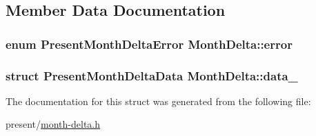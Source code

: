 \subsection{\-Member \-Data \-Documentation}
\hypertarget{structMonthDelta_a437eb7cd23ab33a773a8fb97b5923454}{
\subsubsection[{error}]{\setlength{\rightskip}{0pt plus 5cm}enum {\bf \-Present\-Month\-Delta\-Error} {\bf \-Month\-Delta\-::error}}}\label{structMonthDelta_a437eb7cd23ab33a773a8fb97b5923454}
\hypertarget{structMonthDelta_a428f2591ca57d192424b298f95c87978}{
\subsubsection[{data\-\_\-}]{\setlength{\rightskip}{0pt plus 5cm}struct \-Present\-Month\-Delta\-Data {\bf \-Month\-Delta\-::data\-\_\-}}}\label{structMonthDelta_a428f2591ca57d192424b298f95c87978}


\-The documentation for this struct was generated from the following file\-:\begin{DoxyCompactItemize}
\item 
present/\hyperlink{month-delta_8h}{month-\/delta.\-h}\end{DoxyCompactItemize}
